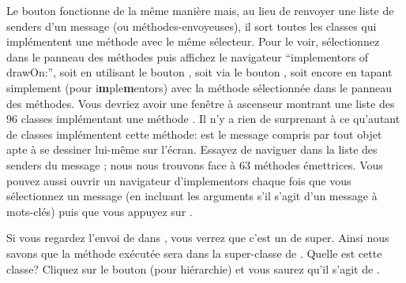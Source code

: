 \documentclass[a4paper,10pt,twoside]{book}
\begin{document}
Le bouton  fonctionne de la m\^eme mani\`ere mais,
au lieu de renvoyer une liste de senders d'un message (ou m\'ethodes-envoyeuses), il sort toutes les
classes qui impl\'ementent une m\'ethode avec le m\^eme s\'electeur.
Pour le voir, s\'electionnez  dans le panneau des m\'ethodes
puis affichez le navigateur ``implementors of drawOn:'', 
soit en utilisant le bouton , soit via le bouton 
, soit encore en tapant simplement  (pour {i\textbf{m}ple\textbf{m}entors}) avec la m\'ethode  s\'electionn\'ee dans le panneau des m\'ethodes. 
Vous devriez avoir une fen\^etre \`a ascenseur montrant une liste des 96
classes impl\'ementant une m\'ethode .
Il n'y a rien de surprenant \`a ce qu'autant de classes impl\'ementent cette
m\'ethode:  est le message compris par tout objet apte \`a se
dessiner lui-m\^eme sur l'\'ecran.
Essayez de naviguer dans la liste des senders du message ; nous nous trouvons face \`a 63 m\'ethodes \'emettrices. Vous pouvez aussi ouvrir
un navigateur d'implementors chaque fois que vous s\'electionnez un message
(en incluant les arguments s'il s'agit d'un message \`a mots-cl\'es) puis
que vous appuyez sur .


Si vous regardez l'envoi de  dans , vous
verrez que c'est un  de super. Ainsi nous
savons que la m\'ethode ex\'ecut\'ee sera dans la super-classe de . Quelle est cette classe? Cliquez sur le bouton  (pour hi\'erarchie) et vous saurez qu'il s'agit de .
\end{document}
